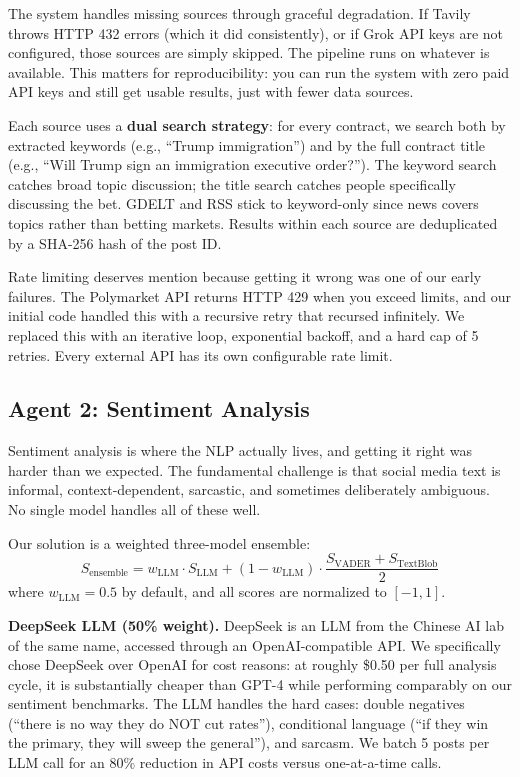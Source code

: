 \documentclass[conference]{IEEEtran}
\begin{document}
The system handles missing sources through graceful degradation. If Tavily throws HTTP 432 errors (which it did consistently), or if Grok API keys are not configured, those sources are simply skipped. The pipeline runs on whatever is available. This matters for reproducibility: you can run the system with zero paid API keys and still get usable results, just with fewer data sources.

Each source uses a \textbf{dual search strategy}: for every contract, we search both by extracted keywords (e.g., ``Trump immigration'') and by the full contract title (e.g., ``Will Trump sign an immigration executive order?''). The keyword search catches broad topic discussion; the title search catches people specifically discussing the bet. GDELT and RSS stick to keyword-only since news covers topics rather than betting markets. Results within each source are deduplicated by a SHA-256 hash of the post ID.

Rate limiting deserves mention because getting it wrong was one of our early failures. The Polymarket API returns HTTP 429 when you exceed limits, and our initial code handled this with a recursive retry that recursed infinitely. We replaced this with an iterative loop, exponential backoff, and a hard cap of 5 retries. Every external API has its own configurable rate limit.

\subsection{Agent 2: Sentiment Analysis}

Sentiment analysis is where the NLP actually lives, and getting it right was harder than we expected. The fundamental challenge is that social media text is informal, context-dependent, sarcastic, and sometimes deliberately ambiguous. No single model handles all of these well.

Our solution is a weighted three-model ensemble:
\begin{equation}
S_{\text{ensemble}} = w_{\text{LLM}} \cdot S_{\text{LLM}} + (1 - w_{\text{LLM}}) \cdot \frac{S_{\text{VADER}} + S_{\text{TextBlob}}}{2}
\label{eq:ensemble}
\end{equation}
where $w_{\text{LLM}} = 0.5$ by default, and all scores are normalized to $[-1, 1]$.

\textbf{DeepSeek LLM (50\% weight).} DeepSeek is an LLM from the Chinese AI lab of the same name, accessed through an OpenAI-compatible API. We specifically chose DeepSeek over OpenAI for cost reasons: at roughly \$0.50 per full analysis cycle, it is substantially cheaper than GPT-4 while performing comparably on our sentiment benchmarks. The LLM handles the hard cases: double negatives (``there is no way they do NOT cut rates''), conditional language (``if they win the primary, they will sweep the general''), and sarcasm. We batch 5 posts per LLM call for an 80\% reduction in API costs versus one-at-a-time calls.
\end{document}
